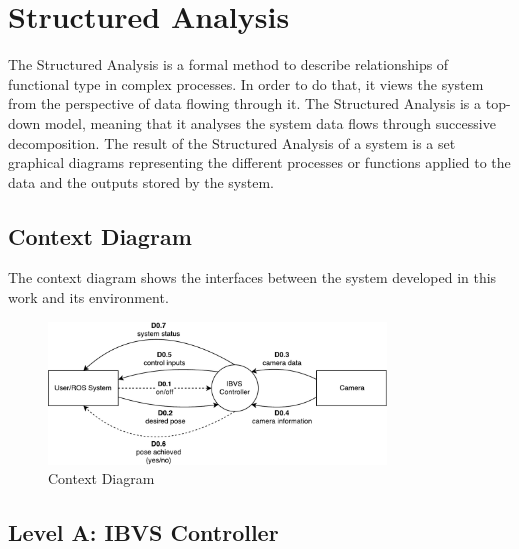 
\section{Structured Analysis}
\label{sec:sa}

The Structured Analysis \cite{Janschek2011} is a formal method to describe relationships of functional type in complex processes. In order to do that, it views the system from the perspective of data flowing through it. The Structured Analysis is a top-down model, meaning that it analyses the system data flows through successive decomposition. The result of the Structured Analysis of a system is a set graphical diagrams representing the different processes or functions applied to the data and the outputs stored by the system.



\subsection{Context Diagram}
\label{sec:context-diagram}

The context diagram shows the interfaces between the system developed in this work and its environment.

\begin{figure}[h]
	\centering
	\includegraphics[width=0.8\textwidth]{content/chapter_03/images/sa_diagram_01.pdf}
	\caption{Context Diagram}
	\label{fig:sa_diag_01}
\end{figure}

\pagebreak

\subsection{Level A: IBVS Controller}
\label{sec:level-A}

